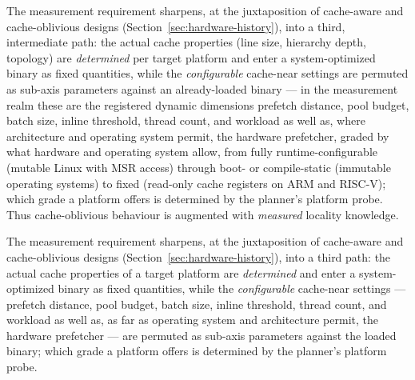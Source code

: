 \begin{nurlang}
The measurement requirement sharpens, at the juxtaposition of cache-aware and cache-oblivious designs
(Section~\ref{sec:hardware-history}), into a third, intermediate path: the actual cache properties (line
size, hierarchy depth, topology) are \emph{determined} per target platform and enter a system-optimized
binary as fixed quantities, while the \emph{configurable} cache-near settings are permuted as sub-axis
parameters against an already-loaded binary --- in the measurement realm these are the registered
dynamic dimensions prefetch distance, pool budget, batch size, inline threshold, thread count, and
workload as well as, where architecture and operating system permit, the hardware prefetcher, graded by
what hardware and operating system allow, from fully runtime-configurable (mutable Linux with MSR access)
through boot- or compile-static (immutable operating systems) to fixed (read-only cache registers on ARM
and RISC-V); which grade a platform offers is determined by the planner's platform probe. Thus
cache-oblivious behaviour is augmented with \emph{measured} locality knowledge.
\end{nurlang}
\begin{nurkurz}
The measurement requirement sharpens, at the juxtaposition of cache-aware and cache-oblivious designs
(Section~\ref{sec:hardware-history}), into a third path: the actual cache properties of a target platform
are \emph{determined} and enter a system-optimized binary as fixed quantities, while the \emph{configurable}
cache-near settings --- prefetch distance, pool budget, batch size, inline threshold, thread count, and
workload as well as, as far as operating system and architecture permit, the hardware prefetcher --- are
permuted as sub-axis parameters against the loaded binary; which grade a platform offers is determined by
the planner's platform probe.
\end{nurkurz}

